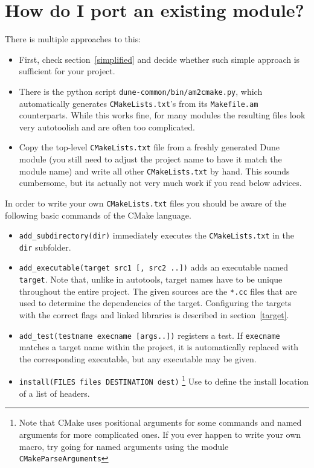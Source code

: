 \documentclass[a4paper,10pt]{scrartcl}
\begin{document}
\section{How do I port an existing module?}
\label{porting}
There is multiple approaches to this:
\begin{itemize}
 \item First, check section~\ref{simplified} and decide whether such simple approach is sufficient for your project.
 \item There is the python script \lstinline!dune-common/bin/am2cmake.py!, which automatically generates \lstinline!CMakeLists.txt!'s from its \lstinline!Makefile.am! counterparts. While this works fine, for many modules the resulting files look very autotoolish and are often too complicated.
 \item Copy the top-level \lstinline!CMakeLists.txt! file from a freshly generated Dune module (you still need to adjust the project name to have it match the module name) and write all other \lstinline!CMakeLists.txt! by hand. This sounds cumbersome, but its actually not very much work if you read below advices.
\end{itemize}

In order to write your own \lstinline!CMakeLists.txt! files you should be aware of the following basic commands of the CMake language.

\begin{itemize}
 \item \lstinline!add_subdirectory(dir)! immediately executes the \lstinline!CMakeLists.txt! in the \lstinline!dir! subfolder.
 \item \lstinline!add_executable(target src1 [, src2 ..])! adds an executable named \lstinline!target!. Note that, unlike in autotools, target names have to be unique throughout the entire project. The given sources are the \lstinline!*.cc! files that are used to determine the dependencies of the target. Configuring the targets with the correct flags and linked libraries is described in section~\ref{target}.
 \item \lstinline!add_test(testname execname [args..])! registers a test. If \lstinline!execname! matches a target name within the project, it is automatically replaced with the corresponding executable, but any executable may be given.
 \item \lstinline!install(FILES files DESTINATION dest)! \footnote{Note that CMake uses positional arguments for some commands and named arguments for more complicated ones. If you ever happen to write your own macro, try going for named arguments using the module \lstinline!CMakeParseArguments!} Use to define the install location of a list of headers.
\end{itemize}
\end{document}
